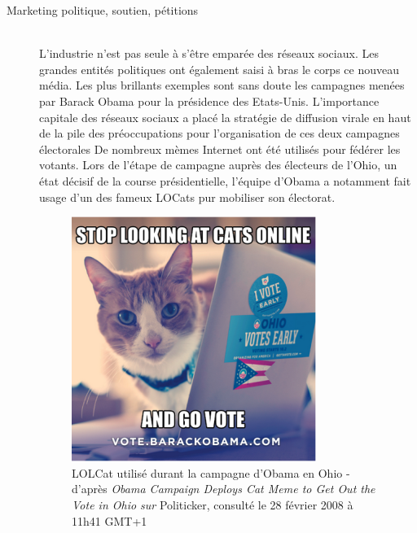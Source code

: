 \begin{description}
\newpage
\item[Marketing politique, soutien, pétitions]
\hfill \\
L{\textquoteright}industrie n{\textquoteright}est pas seule à s{\textquoteright}être emparée des réseaux sociaux. Les grandes entités politiques ont également saisi à bras le corps ce nouveau média. Les plus brillants exemples sont sans doute les campagnes menées par Barack Obama pour la présidence des Etats-Unis. L{\textquoteright}importance capitale des réseaux sociaux a placé la stratégie de diffusion virale en haut de la pile des préoccupations pour l{\textquoteright}organisation de ces deux campagnes électorales \citep{Miller2008} De nombreux mèmes Internet ont été utilisés pour fédérer les votants. Lors de l{\textquoteright}étape de campagne auprès des électeurs de l{\textquoteright}Ohio, un état décisif de la course présidentielle, l{\textquoteright}équipe d{\textquoteright}Obama a notamment fait usage d{\textquoteright}un des fameux LOCats pur mobiliser son électorat. 


\begin{figure}[htpb]
    \centering
    \includegraphics[scale=0.8]{figures/chap2/chapitre2-img16.png}
    \caption[Lolcat utilisé lors la campagne d'Obama]{ 
        LOLCat utilisé durant la campagne d{\textquoteright}Obama en Ohio - d{\textquoteright}après \textit{Obama Campaign Deploys Cat Meme to Get Out the Vote in Ohio sur }Politicker, consulté le 28 février 2008 à 11h41 GMT+1
    } 
    \label{fig:obama-cat}
\end{figure}


\end{description}
